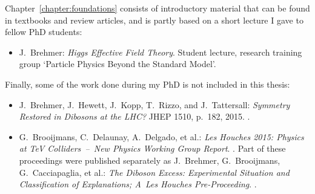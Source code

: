 %
Chapter~\ref{chapter:foundations} consists of introductory material
that can be found in textbooks and review articles, and is partly
based on a short lecture I gave to fellow PhD students:
%
\begin{itemize}
  \item[\cite{Brehmer:EFTlecture}]  J.~Brehmer:\newline
	\emph{Higgs Effective Field Theory}.\newline
        Student lecture, research training group `Particle Physics Beyond the Standard Model'.
\end{itemize}

\begin{samepage}
Finally, some of the work done during my PhD is not included in this thesis:
%
\begin{itemize}
  \item[\cite{Brehmer:2015cia}] J.~Brehmer, J.~Hewett, J.~Kopp, T.~Rizzo, and J.~Tattersall:\newline
	\emph{Symmetry Restored in Dibosons at the LHC?} \newline
	JHEP 1510, p.~182, 2015. .
  \item[\cite{Brehmer:2015dan,Brooijmans:2016vro}] G.~Brooijmans, C.~Delaunay, A.~Delgado, et al.:\newline
         \emph{Les Houches 2015: Physics at TeV Colliders~--~New Physics Working Group Report}.\newline
        .\newline
         Part of these proceedings were published separately as\newline
         J.~Brehmer, G.~Brooijmans,  G.~Cacciapaglia, et al.:\newline
	\emph{The Diboson Excess: Experimental Situation and Classification of Explanations; A~Les Houches Pre-Proceeding}.\newline
	.
\end{itemize}
\end{samepage}
